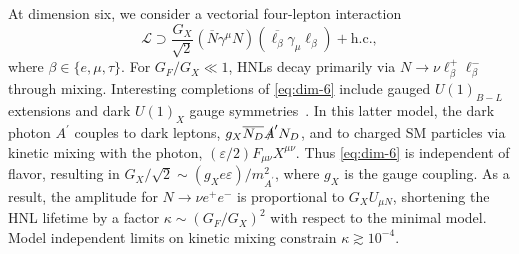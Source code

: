 \documentclass[
reprint,
superscriptaddress,
showpacs,
preprintnumbers,
bibnotes,
amsmath,
amssymb,
aps,
prd,
floatfix
]{revtex4-2}
\begin{document}
At dimension six, we consider a vectorial four-lepton interaction
\begin{equation}\label{eq:dim-6}
    \mathcal{L} \supset \frac{G_X}{\sqrt{2}} \left(\overline{N} \gamma^\mu N \right) \left( \overline{\ell_\beta} \gamma_\mu \ell_\beta \right) + \text{h.c.},
\end{equation}
where $\beta \in \{e,\mu,\tau\}$. 
For $G_F/G_X \ll 1$, HNLs decay primarily via $N \to \nu \ell_\beta^+ \ell_\beta^-$ through mixing. 
Interesting completions of \cref{eq:dim-6} include gauged $U(1)_{B-L}$ extensions and dark $U(1)_X$ gauge symmetries~\cite{Bertuzzo:2018ftf,Abdullahi:2020nyr}.
In this latter model, the dark photon $A^\prime$ couples to dark leptons, $g_X \overline{N_D} \slashed{A}^\prime N_D$, and to charged SM particles via kinetic mixing with the photon, $(\varepsilon/2) F_{\mu\nu} X^{\mu\nu}$. 
Thus \cref{eq:dim-6} is independent of flavor, resulting in $G_X/\sqrt{2} \sim (g_X e \varepsilon)/m_{A^\prime}^2$, where $g_X$ is the gauge coupling. 
As a result, the amplitude for $N\to\nu e^+e^-$ is proportional to $G_X U_{\mu N}$, shortening the HNL lifetime by a factor $ \kappa \sim (G_F/G_X)^2$ with respect to the minimal model.
Model independent limits on kinetic mixing constrain $\kappa \gtrsim 10^{-4}$. 

\end{document}

